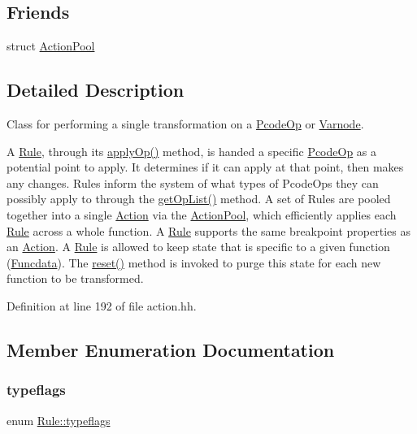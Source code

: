 \subsection*{Friends}
\begin{DoxyCompactItemize}
\item 
struct \mbox{\hyperlink{class_rule_a11322726e5924e10ecfc5307baf9958c}{Action\+Pool}}
\end{DoxyCompactItemize}


\subsection{Detailed Description}
Class for performing a single transformation on a \mbox{\hyperlink{class_pcode_op}{Pcode\+Op}} or \mbox{\hyperlink{class_varnode}{Varnode}}. 

A \mbox{\hyperlink{class_rule}{Rule}}, through its \mbox{\hyperlink{class_rule_a4e3e61f066670175009f60fb9dc60848}{apply\+Op()}} method, is handed a specific \mbox{\hyperlink{class_pcode_op}{Pcode\+Op}} as a potential point to apply. It determines if it can apply at that point, then makes any changes. Rules inform the system of what types of Pcode\+Ops they can possibly apply to through the \mbox{\hyperlink{class_rule_a4023bfc7825de0ab866790551856d10e}{get\+Op\+List()}} method. A set of Rules are pooled together into a single \mbox{\hyperlink{class_action}{Action}} via the \mbox{\hyperlink{class_action_pool}{Action\+Pool}}, which efficiently applies each \mbox{\hyperlink{class_rule}{Rule}} across a whole function. A \mbox{\hyperlink{class_rule}{Rule}} supports the same breakpoint properties as an \mbox{\hyperlink{class_action}{Action}}. A \mbox{\hyperlink{class_rule}{Rule}} is allowed to keep state that is specific to a given function (\mbox{\hyperlink{class_funcdata}{Funcdata}}). The \mbox{\hyperlink{class_rule_a1f074d593a6fefc79a5c07e4b3e13674}{reset()}} method is invoked to purge this state for each new function to be transformed. 

Definition at line 192 of file action.\+hh.



\subsection{Member Enumeration Documentation}
\mbox{\label{class_rule_a605c4d4f6690f01deb9aa08c358fbc43}} 
\subsubsection{\texorpdfstring{typeflags}{typeflags}}
{\footnotesize\ttfamily enum \mbox{\hyperlink{class_rule_a605c4d4f6690f01deb9aa08c358fbc43}{Rule\+::typeflags}}}



